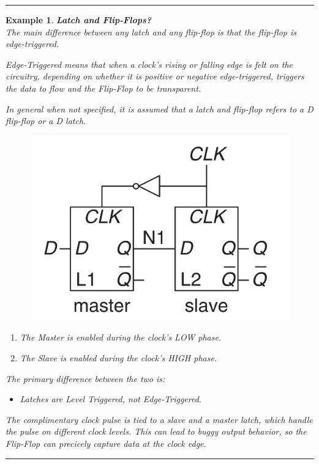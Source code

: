 \documentclass[12pt]{article}
\newtheorem{example}{Example}
\newenvironment{examp}
{
	\vspace{.5cm}
	\hrule
\begin{example}\upshape}
	{\hrule
		\vspace{0.5cm}
\end{example}}
\begin{document}
\begin{examp}
	\textbf{Latch and Flip-Flops?}\\
	The main difference between any latch and any
	flip-flop is that the flip-flop is \textit{edge-triggered}.

	Edge-Triggered means that when a clock's rising or falling edge is felt on the circuitry, depending on whether it is positive or negative edge-triggered, triggers the data to flow and the Flip-Flop to be transparent.

	In general when
	not specified, it is assumed that a \textit{latch} and \textit{flip-flop}
	refers to a D flip-flop or a D latch.
	\begin{figure}[H]
		\centering
		\includegraphics[scale=.3]{examp082.png}
	\end{figure}
	\begin{enumerate}
		\item The Master is enabled during the clock's LOW phase.
		\item The Slave is enabled during the clock's HIGH phase.
	\end{enumerate}
	The primary difference between the two is:

	\begin{itemize}
		\item Latches are Level Triggered, not Edge-Triggered.
	\end{itemize}

	The complimentary clock pulse
	is tied to a slave and a master latch, which handle the pulse on different
	clock \textit{levels}. This can lead to buggy output behavior, so the
	Flip-Flop can precicely capture data at the clock edge.


\end{examp}
\end{document}
